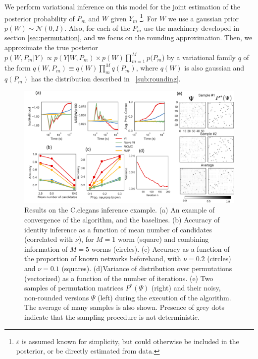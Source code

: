 \documentclass[twoside]{article}
\begin{document}
We perform variational inference on this model for the joint estimation of the posterior probability of $P_m$ and $W$ given  $Y_m$ \footnote{$\varepsilon$ is assumed known for simplicity, but could otherwise be included in the posterior, or be directly estimated from data.}. For $W$ we use a gaussian prior $p(W)\sim \mathcal{N}(0, I)$. Also, for each of the $P_m$ use the machinery developed in section \ref{sec:permutation}, and we focus on the rounding approximation. 
Then, we approximate the true posterior $p(W,P_m|Y)\propto p(Y|W,P_m)\times p(W)\prod_{m=1}^M p(P_m$)  by a variational family $q$ of the form $q(W,P_m)\equiv q(W)\prod_m^M q(P_m)$, where $q(W)$ is also gaussian and $q(P_m)$ has the distribution described in ~\ref{sub:rounding}. 


\begin{figure}[ht]
  \centering
  \includegraphics[width=1.0\textwidth]{../figures/figure7.pdf} 
  \caption{Results on the C.elegans inference example. (a) An example of convergence of the algorithm, and the baselines. (b) Accuracy of identity inference as a function of mean number of candidates (correlated with $\nu$), for $M=1$ worm (square) and combining information of $M=5$ worms (circles). (c) Accuracy as a function of the proportion of known networks beforehand,  with $\nu=0.2$ (circles) and $\nu=0.1$ (squares). (d)Variance of distribution over permutations (vectorized) as a function of the number of iterations. (e) Two samples of permutation matrices $P^*(\Psi)$ (right) and their noisy, non-rounded versions $\Psi$ (left) during the execution of the algorithm. The average of many samples is also shown. Presence of grey dots indicate that the sampling procedure is not deterministic.}
\label{fig:elegantresults}
\end{figure}
\end{document}
